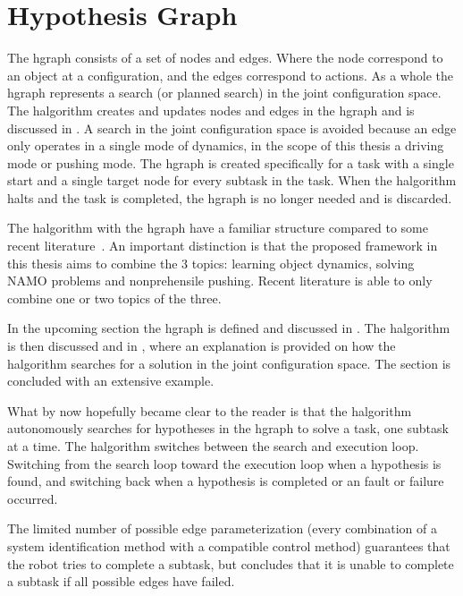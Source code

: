 \section{Hypothesis Graph}%
\label{sec:hgraph}
The \acf{hgraph} consists of a set of nodes and edges. Where the node correspond to an object at a configuration, and the edges correspond to actions. As a whole the \ac{hgraph} represents a search (or planned search) in the joint configuration space. The \ac{halgorithm} creates and updates nodes and edges in the \ac{hgraph} and is discussed in . A search in the joint configuration space is avoided because an edge only operates in a single mode of dynamics, in the scope of this thesis a driving mode or pushing mode. The \ac{hgraph} is created specifically for a task with a single start and a single target node for every subtask in the task. When the \ac{halgorithm} halts and the task is completed, the \ac{hgraph} is no longer needed and is discarded.\bs

The \ac{halgorithm} with the \ac{hgraph} have a familiar structure compared to some recent literature~\cite{ellis_navigation_2022,wang_affordancebased_2020}. An important distinction is that the proposed framework in this thesis aims to combine the 3 topics: learning object dynamics, solving \ac{NAMO} problems and nonprehensile pushing. Recent literature is able to only combine one or two topics of the three.\bs

In the upcoming section the \ac{hgraph} is defined and discussed in . The \ac{halgorithm} is then discussed and in , where an explanation is provided on how the \ac{halgorithm} searches for a solution in the joint configuration space. The section is concluded with an extensive example.\bs





What by now hopefully became clear to the reader is that the \ac{halgorithm} autonomously searches for hypotheses in the \ac{hgraph} to solve a task, one subtask at a time. The \ac{halgorithm} switches between the search and execution loop. Switching from the search loop toward the execution loop when a hypothesis is found, and switching back when a hypothesis is completed or an fault or failure occurred.\bs

The limited number of possible edge parameterization (every combination of a system identification method with a compatible control method) guarantees that the robot tries to complete a subtask, but concludes that it is unable to complete a subtask if all possible edges have failed.\bs

